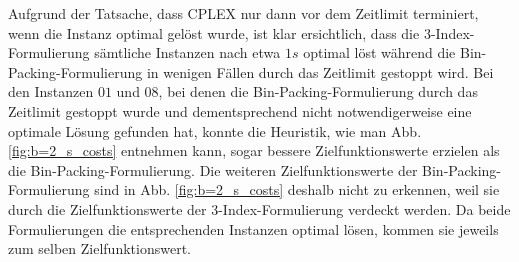 Aufgrund der Tatsache, dass CPLEX nur dann vor dem Zeitlimit terminiert, wenn die Instanz optimal gelöst wurde, ist klar
ersichtlich, dass die 3-Index-Formulierung sämtliche Instanzen nach etwa $1s$ optimal löst während die Bin-Packing-Formulierung in wenigen Fällen durch das Zeitlimit gestoppt wird.\newline
Bei den Instanzen $01$ und $08$, bei denen die Bin-Packing-Formulierung durch das Zeitlimit gestoppt wurde und dementsprechend nicht
notwendigerweise eine optimale Lösung gefunden hat, konnte die Heuristik, wie man Abb. \ref{fig:b=2_s_costs} entnehmen kann, sogar
bessere Zielfunktionswerte erzielen als die Bin-Packing-Formulierung.\newline
Die weiteren Zielfunktionswerte der Bin-Packing-Formulierung sind in Abb. \ref{fig:b=2_s_costs}  deshalb nicht zu erkennen,
weil sie durch die Zielfunktionswerte der 3-Index-Formulierung verdeckt werden. Da beide Formulierungen die entsprechenden
Instanzen optimal lösen, kommen sie jeweils zum selben Zielfunktionswert.

